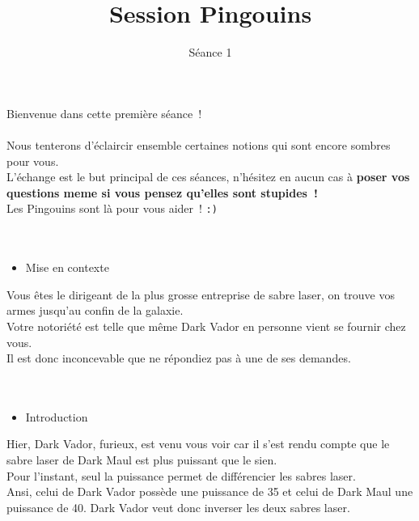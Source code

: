 \documentclass{koala-en}
\begin{document}
\title{Session Pingouins}
\subtitle{Séance 1}

\maketitle

{
	Bienvenue dans cette première séance~!\\\\
	Nous tenterons d'éclaircir ensemble certaines notions qui sont encore sombres pour vous.\\
	L'échange est le but principal de ces séances, n'hésitez en aucun cas à \textbf{poser vos questions meme si vous pensez qu'elles sont stupides~!}
	\\
	Les Pingouins sont là pour vous aider~! \texttt{:)} \\
	\\ \\
	\begin{itemize}
		\item	Mise en contexte
	\end{itemize}

	Vous êtes le dirigeant de la plus grosse entreprise de sabre laser, on trouve vos armes jusqu'au confin de la galaxie.\\
	Votre notoriété est telle que même Dark Vador en personne vient se fournir chez vous.\\
	Il est donc inconcevable que ne répondiez pas à une de ses demandes.\\
	\\ \\
	\begin{itemize}
		\item	Introduction
	\end{itemize}

	Hier, Dark Vador, furieux, est venu vous voir car il s'est rendu compte que le sabre laser de Dark Maul est plus puissant que le sien.\\
	Pour l'instant, seul la puissance permet de différencier les sabres laser.\\
	Ansi, celui de Dark Vador possède une puissance de 35 et celui de Dark Maul une puissance de 40. Dark Vador veut donc inverser les deux sabres laser.\\
}

\newpage
\thispagestyle{empty}

\tableofcontents

\clearpage
\thispagestyle{empty}
\newpage
\end{document}
